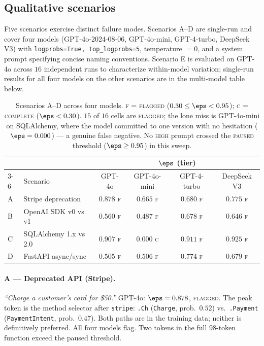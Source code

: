 \subsection{Qualitative scenarios}
\label{subsec:scenarios}

Five scenarios exercise distinct failure modes. Scenarios A--D are
single-run and cover four models (GPT-4o-2024-08-06, GPT-4o-mini,
GPT-4-turbo, DeepSeek V3) with \texttt{logprobs=True,
top\_logprobs=5}, temperature $= 0$, and a system prompt specifying
concise naming conventions. Scenario E is evaluated on GPT-4o across
$16$ independent runs to characterize within-model variation;
single-run results for all four models on the other scenarios are in
the multi-model table below.

\begin{table}[h]
\centering
\small
\begin{tabular}{llcccc}
\toprule
 & & \multicolumn{4}{c}{$\eps$ (tier)} \\
\cmidrule(lr){3-6}
 & Scenario & GPT-4o & GPT-4o-mini & GPT-4-turbo & DeepSeek V3 \\
\midrule
A & Stripe deprecation        & $0.878$ \textsc{f} & $0.665$ \textsc{f} & $0.680$ \textsc{f} & $0.775$ \textsc{f} \\
B & OpenAI SDK v0 vs v1       & $0.560$ \textsc{f} & $0.487$ \textsc{f} & $0.678$ \textsc{f} & $0.646$ \textsc{f} \\
C & SQLAlchemy 1.x vs 2.0     & $0.907$ \textsc{f} & $\mathbf{0.000}$ \textsc{c} & $0.911$ \textsc{f} & $0.925$ \textsc{f} \\
D & FastAPI async/sync        & $0.505$ \textsc{f} & $0.506$ \textsc{f} & $0.774$ \textsc{f} & $0.679$ \textsc{f} \\
\bottomrule
\end{tabular}
\caption{Scenarios A--D across four models. \textsc{f} =
\textsc{flagged} ($0.30 \le \eps < 0.95$); \textsc{c} =
\textsc{complete} ($\eps < 0.30$). $15$ of $16$ cells are
\textsc{flagged}; the lone miss is GPT-4o-mini on SQLAlchemy, where
the model committed to one version with no hesitation ($\eps =
0.000$) --- a genuine false negative. No \textsc{high} prompt
crossed the \textsc{paused} threshold ($\eps \ge 0.95$) in this
sweep.}
\label{tab:scenarios-multimodel}
\end{table}

\paragraph{A --- Deprecated API (Stripe).}
\textit{``Charge a customer's card for \$50.''} GPT-4o: $\eps =
0.878$, \textsc{flagged}. The peak token is the method selector
after \texttt{stripe}: \texttt{.Ch} (\texttt{Charge}, prob.\ $0.52$)
vs.\ \texttt{.Payment} (\texttt{PaymentIntent}, prob.\ $0.47$). Both
paths are in the training data; neither is definitively preferred.
All four models flag. Two tokens in the full $98$-token function
exceed the paused threshold.

